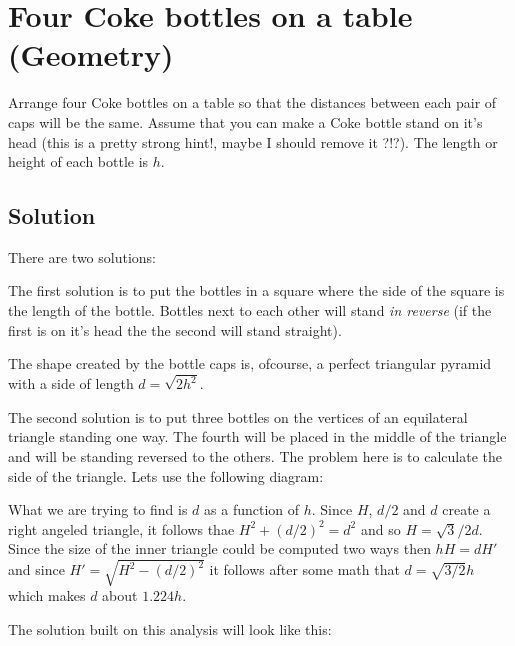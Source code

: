 \documentclass{article}
\begin{document}
\section{Four Coke bottles on a table (Geometry)}
Arrange four Coke bottles on a table so that the distances between each pair of caps will be the same. Assume that
you can make a Coke bottle stand on it's head (this is a pretty strong hint!, maybe I should remove it ?!?). The length
or height of each bottle is ${h}$.

\subsection{Solution}
There are two solutions:

The first solution is to put the bottles in a square where the side of the square is the length of the bottle. Bottles
next to each other will stand \emph{in reverse} (if the first is on it's head the the second will stand straight).

\begin{center}

\end{center}

The shape created by the bottle caps is, ofcourse, a perfect triangular pyramid with a side of length $d=\sqrt{2h^2}$.

The second solution is to put three bottles on the vertices of an equilateral triangle standing one way. The fourth will be placed
in the middle of the triangle and will be standing reversed to the others. The problem here is to calculate the side of the triangle.
Lets use the following diagram:

\begin{center}

\end{center}

What we are trying to find is $d$ as a function of $h$. Since $H$, $d/2$ and $d$ create a right angeled triangle, it follows
thae $H^2+(d/2)^2=d^2$ and so $H=\sqrt{3}/2d$. Since the size of the inner triangle could be computed two ways then $hH=dH'$ and
since $H'=\sqrt{H^2-(d/2)^2}$ it follows after some math that $d=\sqrt{3/2}h$ which makes $d$ about $1.224h$.

The solution built on this analysis will look like this:

\begin{center}

\end{center}
\end{document}
